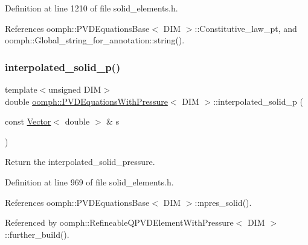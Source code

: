 Definition at line 1210 of file solid\+\_\+elements.\+h.



References oomph\+::\+P\+V\+D\+Equations\+Base$<$ D\+I\+M $>$\+::\+Constitutive\+\_\+law\+\_\+pt, and oomph\+::\+Global\+\_\+string\+\_\+for\+\_\+annotation\+::string().

\mbox{\label{classoomph_1_1PVDEquationsWithPressure_a9d8ecc731f98d8d4aae18b55f835bc61}} 
\subsubsection{\texorpdfstring{interpolated\+\_\+solid\+\_\+p()}{interpolated\_solid\_p()}}
{\footnotesize\ttfamily template$<$unsigned D\+IM$>$ \\
double \hyperlink{classoomph_1_1PVDEquationsWithPressure}{oomph\+::\+P\+V\+D\+Equations\+With\+Pressure}$<$ D\+IM $>$\+::interpolated\+\_\+solid\+\_\+p (\begin{DoxyParamCaption}\item[{const \hyperlink{classoomph_1_1Vector}{Vector}$<$ double $>$ \&}]{s }\end{DoxyParamCaption})\hspace{0.3cm}{\ttfamily [inline]}}



Return the interpolated\+\_\+solid\+\_\+pressure. 



Definition at line 969 of file solid\+\_\+elements.\+h.



References oomph\+::\+P\+V\+D\+Equations\+Base$<$ D\+I\+M $>$\+::npres\+\_\+solid().



Referenced by oomph\+::\+Refineable\+Q\+P\+V\+D\+Element\+With\+Pressure$<$ D\+I\+M $>$\+::further\+\_\+build().

\mbox{\label{classoomph_1_1PVDEquationsWithPressure_acdcef316bde216f8b70520248b83f40c}} 
